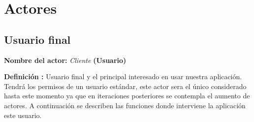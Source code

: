\section{Actores}

\subsection{Usuario final}
\textbf{Nombre del actor:} \textit{Cliente} \textbf{(Usuario)}\par
\textbf{Definición :} Usuario final y el principal interesado en usar nuestra aplicación. Tendrá los permisos de un usuario estándar, este actor sera el único considerado hasta este momento ya que en iteraciones posteriores se contempla el aumento de actores. A continuación se describen las funciones donde interviene la aplicación este usuario.